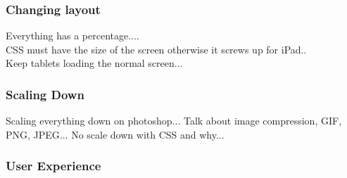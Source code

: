 \subsubsection{Changing layout}	    %
Everything has a percentage....\\
CSS must have the size of the screen otherwise it screws up for iPad..\\
Keep tablets loading the normal screen...\\ %
\subsubsection{Scaling Down}		    %
Scaling everything down on photoshop...
Talk about image compression, GIF, PNG, JPEG...
No scale down with CSS and why...

\subsubsection{User Experience}	    %


